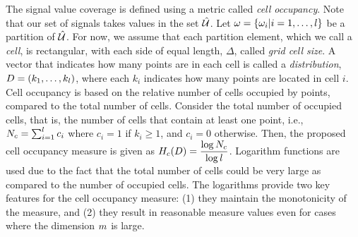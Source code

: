The signal value coverage is defined using a metric called {\em cell occupancy}. Note that our set of signals takes values in the set $\hat{\mathcal{U}}$.
Let $\omega=\{ \omega_i | i=1,\ldots,
l \}$ be a partition of $\hat{\mathcal{U}}$. For now, we assume that each partition element,
which we call a \emph{cell}, is rectangular, with each side of equal
length, $\Delta$, called \emph{grid cell size}. A
vector that indicates how many points are in each cell is called a
\emph{distribution}, $D=(k_1,\ldots, k_l)$,
where each $k_i$ indicates how many points are located in cell $i$.
Cell occupancy is based on the relative number of cells occupied by
points, compared to the total number of cells. Consider the total
number of occupied cells, that is, the number of cells that contain
at least one point, i.e., $N_c =  \sum_{i=1}^{l} c_i$  
where $c_i = 1$ if  $k_i\geq 1$, and $c_i = 0$ otherwise. Then, the proposed cell occupancy measure is given as
$H_c(D) = \displaystyle{ \frac{\log N_c}{\log l}}$.
Logarithm functions are used due to the fact that the total number of cells could be very large as compared to the number of occupied cells. The logarithms provide two key features for the cell occupancy measure: (1) they maintain the monotonicity of the measure, and (2) they result in reasonable measure values even for cases where the dimension $m$ is  large. 
% 

